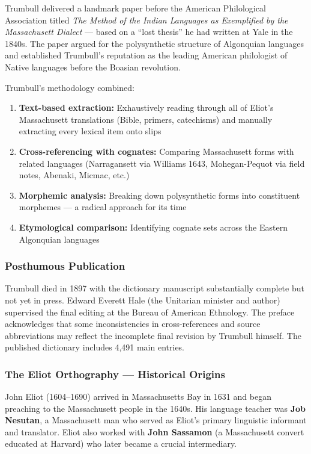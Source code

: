 Trumbull delivered a landmark paper before the American Philological
Association titled \emph{The Method of the Indian Languages as Exemplified by
the Massachusett Dialect} --- based on a ``lost thesis'' he had written at
Yale in the 1840s. The paper argued for the polysynthetic structure of
Algonquian languages and established Trumbull's reputation as the leading
American philologist of Native languages before the Boasian revolution.

Trumbull's methodology combined:
\begin{enumerate}
  \item \textbf{Text-based extraction:} Exhaustively reading through all of
    Eliot's Massachusett translations (Bible, primers, catechisms) and
    manually extracting every lexical item onto slips
  \item \textbf{Cross-referencing with cognates:} Comparing Massachusett
    forms with related languages (Narragansett via Williams 1643,
    Mohegan-Pequot via field notes, Abenaki, Micmac, etc.)
  \item \textbf{Morphemic analysis:} Breaking down polysynthetic forms into
    constituent morphemes --- a radical approach for its time
  \item \textbf{Etymological comparison:} Identifying cognate sets across the
    Eastern Algonquian languages
\end{enumerate}

\subsubsection{Posthumous Publication}

Trumbull died in 1897 with the dictionary manuscript substantially complete
but not yet in press. Edward Everett Hale (the Unitarian minister and author)
supervised the final editing at the Bureau of American Ethnology. The preface
acknowledges that some inconsistencies in cross-references and source
abbreviations may reflect the incomplete final revision by Trumbull himself.
The published dictionary includes 4,491 main entries.

\subsubsection{The Eliot Orthography --- Historical Origins}

John Eliot (1604--1690) arrived in Massachusetts Bay in 1631 and began
preaching to the Massachusett people in the 1640s. His language teacher was
\textbf{Job Nesutan}, a Massachusett man who served as Eliot's primary
linguistic informant and translator. Eliot also worked with \textbf{John
Sassamon} (a Massachusett convert educated at Harvard) who later became a
crucial intermediary.

